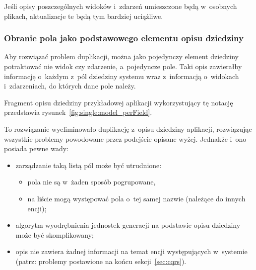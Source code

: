 Jeśli opisy poszczególnych widoków i~zdarzeń umieszczone będą w~osobnych plikach, aktualizacje te będą tym bardziej uciążliwe.

%
%
%
%
%

\subsubsection{Obranie pola jako podstawowego elementu opisu dziedziny}

Aby rozwiązać problem duplikacji, można jako pojedynczy element dziedziny potraktować nie widok czy zdarzenie, a~pojedyncze pole.
Taki opis zawierałby informację o~każdym z~pól dziedziny systemu wraz z~informacją o~widokach i~zdarzeniach, do których dane pole należy.

Fragment opisu dziedziny przykładowej aplikacji wykorzystujący tę notację przedstawia rysunek~\ref{fig:single:model_perField}.



To rozwiązanie wyeliminowało duplikację z~opisu dziedziny aplikacji, rozwiązując wszystkie problemy powodowane przez podejście opisane wyżej.
Jednakże i~ono posiada pewne wady:

\begin{itemize}
 \item zarządzanie taką listą pól może być utrudnione:
  \begin{itemize}
   \item pola nie są w~żaden sposób pogrupowane,
   \item na liście mogą występować pola o~tej samej nazwie (należące do innych encji);
  \end{itemize}
 \item algorytm wyodrębnienia jednostek generacji na podstawie opisu dziedziny może być skomplikowany;
 \item opis nie zawiera żadnej informacji na temat encji występujących w~systemie (patrz: problemy postawione na końcu sekcji~\ref{sec:cqrs}).
\end{itemize}

